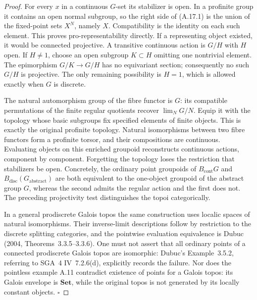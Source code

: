 \begin{proof}
For every $x$ in a continuous $G$-set its stabilizer is open. In a profinite group it contains an open normal subgroup, so the right side of (A.17.1) is the union of the fixed-point sets $X^N$, namely $X$. Compatibility is the identity on each such element. This proves pro-representability directly. If a representing object existed, it would be connected projective. A transitive continuous action is $G/H$ with $H$ open. If $H\ne1$, choose an open subgroup $K\subset H$ omitting one nontrivial element. The epimorphism $G/K\to G/H$ has no equivariant section; consequently no such $G/H$ is projective. The only remaining possibility is $H=1$, which is allowed exactly when $G$ is discrete.

The natural automorphism group of the fibre functor is $G$: its compatible permutations of the finite regular quotients recover $\lim_NG/N$. Equip it with the topology whose basic subgroups fix specified elements of finite objects. This is exactly the original profinite topology. Natural isomorphisms between two fibre functors form a profinite torsor, and their compositions are continuous. Evaluating objects on this enriched groupoid reconstructs continuous actions, component by component. Forgetting the topology loses the restriction that stabilizers be open. Concretely, the ordinary point groupoids of $B_{\mathrm{cont}}G$ and $B_{\mathrm{disc}}(G_{\mathrm{abstract}})$ are both equivalent to the one-object groupoid of the abstract group $G$, whereas the second admits the regular action and the first does not. The preceding projectivity test distinguishes the topoi categorically.

In a general prodiscrete Galois topos the same construction uses localic spaces of natural isomorphisms. Their inverse-limit descriptions follow by restriction to the discrete splitting categories, and the pointwise evaluation equivalence is Dubuc (2004, Theorems~3.3.5--3.3.6). One must not assert that all ordinary points of a connected prodiscrete Galois topos are isomorphic: Dubuc's Example~3.5.2, referring to SGA~4 IV~7.2.6(d), explicitly records the failure. Nor does the pointless example A.11 contradict existence of points for a Galois topos: its Galois envelope is $\mathbf{Set}$, while the original topos is not generated by its locally constant objects. \hfill$\square$
\end{proof}

